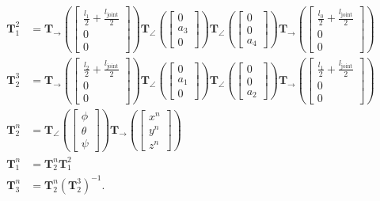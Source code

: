 \begin{align}
    \bm{T}_1^2 &= \bm{T}_{\rightarrow}\left( \begin{bmatrix} \frac{l_1}{2}+\frac{l_{\textrm{joint}}}{2} \\ 0 \\ 0\end{bmatrix}\right)
        \bm{T}_{\angle}\left( \begin{bmatrix} 0 \\ a_3 \\ 0\end{bmatrix}\right)
        \bm{T}_{\angle}\left( \begin{bmatrix} 0 \\ 0 \\ a_4\end{bmatrix}\right)
            \bm{T}_{\rightarrow}\left( \begin{bmatrix} \frac{l_0}{2}+\frac{l_{\textrm{joint}}}{2} \\ 0 \\ 0\end{bmatrix}\right) \\
    \bm{T}_2^3 &= \bm{T}_{\rightarrow}\left( \begin{bmatrix} \frac{l_2}{2}+\frac{l_{\textrm{joint}}}{2} \\ 0 \\ 0\end{bmatrix}\right)
        \bm{T}_{\angle}\left( \begin{bmatrix} 0 \\ a_1 \\ 0\end{bmatrix}\right)
        \bm{T}_{\angle}\left( \begin{bmatrix} 0 \\ 0 \\ a_2\end{bmatrix}\right)
            \bm{T}_{\rightarrow}\left( \begin{bmatrix} \frac{l_1}{2}+\frac{l_{\textrm{joint}}}{2} \\ 0 \\ 0\end{bmatrix}\right) \\
    \bm{T}_2^n &= \bm{T}_{\angle}\left( \begin{bmatrix} \phi \\ \theta \\ \psi\end{bmatrix}\right)
        \bm{T}_{\rightarrow}\left( \begin{bmatrix} x^n \\ y^n \\ z^n\end{bmatrix}\right) \\
            \bm{T}_1^n &= \bm{T}_2^n \bm{T}_1^2 \\
            \bm{T}_3^n &= \bm{T}_2^n \left(\bm{T}_2^3\right)^{-1}.
\end{align}
